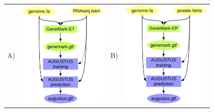 \documentclass[a4paper,10pt]{report}
\begin{document}
\begin{figure}
\begin{center}
\begin{tabular}{c c c c }
 A) & \includegraphics[scale=0.4]{./figs/braker1.pdf} & B) &  \includegraphics[scale=0.4]{./figs/braker2_ep.pdf}\\

\end{tabular}
\end{center}
\end{figure}
\end{document}

